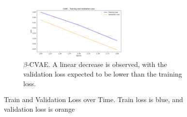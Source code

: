 \begin{figure}[!htbp]
  \vspace{0.5cm}
  
  \begin{subfigure}{\textwidth}
    \centering
    \includegraphics[width=0.65\textwidth]{figures/losses/cvae.png}
    \caption{$\beta$-CVAE. A linear decrease is observed, with the validation loss expected to be lower than the training loss.}
  \end{subfigure}
  
  \caption{Train and Validation Loss over Time. Train loss is blue, and validation loss is orange}
  \label{fig:losses}
\end{figure}
\clearpage
